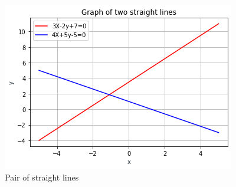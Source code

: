 \documentclass[journal,12pt,twocolumn]{IEEEtran}
\begin{document}
\begin{figure}[h]
    \centering
    \includegraphics[width=\columnwidth]{assignment 6.png}
    \caption{Pair of straight lines}
    \label{Fig :1}
\end{figure}
\end{document}
